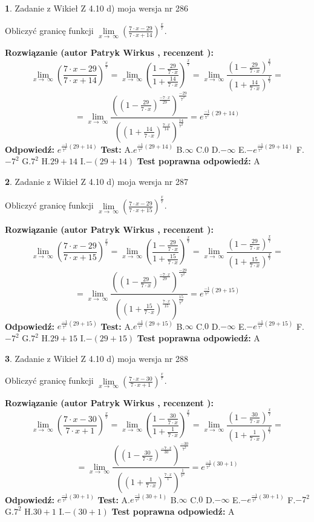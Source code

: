 \documentclass[12pt, a4paper]{article}
\theoremstyle{definition} %
\newtheorem{zad}{}
\newcommand{\zadStart}[1]{\begin{zad}#1\newline}
\newcommand{\zadStop}{\end{zad}}
\newcommand{\rozwStart}[2]{\noindent \textbf{Rozwiązanie (autor #1 , recenzent #2): }\newline}
\newcommand{\rozwStop}{\newline}
\newcommand{\odpStart}{\noindent \textbf{Odpowiedź:}\newline}
\newcommand{\odpStop}{\newline}
\newcommand{\testStart}{\noindent \textbf{Test:}\newline}
\newcommand{\testStop}{\newline}
\newcommand{\kluczStart}{\noindent \textbf{Test poprawna odpowiedź:}\newline}
\newcommand{\kluczStop}{\newline}
\begin{document}
\zadStart{Zadanie z Wikieł Z 4.10 d) moja wersja nr 286}


Obliczyć granicę funkcji  $\lim\limits_{x\to\ \infty}(\frac{7\cdot x-29}{7\cdot x+14})^{\frac{x}{7}}$.
\zadStop
\rozwStart{Patryk Wirkus}{}
$$\lim\limits_{x\to\ \infty}(\frac{7\cdot x-29}{7\cdot x+14})^{\frac{x}{7}} = \lim\limits_{x\to\ \infty}(\frac{1-\frac{29}{7\cdot x}}{1+\frac{14}{7\cdot x}})^{\frac{x}{7}}=\lim\limits_{x\to\ \infty}\frac{(1-\frac{29}{7\cdot x})^{\frac{x}{7}}}{(1+\frac{14}{7\cdot x})^{\frac{x}{7}}}=$$
$$=\lim\limits_{x\to\ \infty}\frac{((1-\frac{29}{7\cdot x})^{\frac{-7\cdot x}{29}})^{\frac{-29}{7^{2}}}}{((1+\frac{14}{7\cdot x})^{\frac{7\cdot x}{14}})^{\frac{14}{7^{2}}}}=e^{\frac{-1}{7^{2}}(29+14)}$$
\rozwStop
\odpStart
$e^{\frac{-1}{7^{2}}(29+14)}$
\odpStop
\testStart
A.$e^{\frac{-1}{7^{2}}(29+14)}$ B.$\infty$ C.$0$ D.$-\infty$ E.$-e^{\frac{-1}{7^{2}}(29+14)}$
F.$-7^{2}$ G.$7^{2}$
H.$29+14$
I.$-(29+14)$
\testStop
\kluczStart
A
\kluczStop



\zadStart{Zadanie z Wikieł Z 4.10 d) moja wersja nr 287}


Obliczyć granicę funkcji  $\lim\limits_{x\to\ \infty}(\frac{7\cdot x-29}{7\cdot x+15})^{\frac{x}{7}}$.
\zadStop
\rozwStart{Patryk Wirkus}{}
$$\lim\limits_{x\to\ \infty}(\frac{7\cdot x-29}{7\cdot x+15})^{\frac{x}{7}} = \lim\limits_{x\to\ \infty}(\frac{1-\frac{29}{7\cdot x}}{1+\frac{15}{7\cdot x}})^{\frac{x}{7}}=\lim\limits_{x\to\ \infty}\frac{(1-\frac{29}{7\cdot x})^{\frac{x}{7}}}{(1+\frac{15}{7\cdot x})^{\frac{x}{7}}}=$$
$$=\lim\limits_{x\to\ \infty}\frac{((1-\frac{29}{7\cdot x})^{\frac{-7\cdot x}{29}})^{\frac{-29}{7^{2}}}}{((1+\frac{15}{7\cdot x})^{\frac{7\cdot x}{15}})^{\frac{15}{7^{2}}}}=e^{\frac{-1}{7^{2}}(29+15)}$$
\rozwStop
\odpStart
$e^{\frac{-1}{7^{2}}(29+15)}$
\odpStop
\testStart
A.$e^{\frac{-1}{7^{2}}(29+15)}$ B.$\infty$ C.$0$ D.$-\infty$ E.$-e^{\frac{-1}{7^{2}}(29+15)}$
F.$-7^{2}$ G.$7^{2}$
H.$29+15$
I.$-(29+15)$
\testStop
\kluczStart
A
\kluczStop



\zadStart{Zadanie z Wikieł Z 4.10 d) moja wersja nr 288}


Obliczyć granicę funkcji  $\lim\limits_{x\to\ \infty}(\frac{7\cdot x-30}{7\cdot x+1})^{\frac{x}{7}}$.
\zadStop
\rozwStart{Patryk Wirkus}{}
$$\lim\limits_{x\to\ \infty}(\frac{7\cdot x-30}{7\cdot x+1})^{\frac{x}{7}} = \lim\limits_{x\to\ \infty}(\frac{1-\frac{30}{7\cdot x}}{1+\frac{1}{7\cdot x}})^{\frac{x}{7}}=\lim\limits_{x\to\ \infty}\frac{(1-\frac{30}{7\cdot x})^{\frac{x}{7}}}{(1+\frac{1}{7\cdot x})^{\frac{x}{7}}}=$$
$$=\lim\limits_{x\to\ \infty}\frac{((1-\frac{30}{7\cdot x})^{\frac{-7\cdot x}{30}})^{\frac{-30}{7^{2}}}}{((1+\frac{1}{7\cdot x})^{\frac{7\cdot x}{1}})^{\frac{1}{7^{2}}}}=e^{\frac{-1}{7^{2}}(30+1)}$$
\rozwStop
\odpStart
$e^{\frac{-1}{7^{2}}(30+1)}$
\odpStop
\testStart
A.$e^{\frac{-1}{7^{2}}(30+1)}$ B.$\infty$ C.$0$ D.$-\infty$ E.$-e^{\frac{-1}{7^{2}}(30+1)}$
F.$-7^{2}$ G.$7^{2}$
H.$30+1$
I.$-(30+1)$
\testStop
\kluczStart
A
\kluczStop
\end{document}
